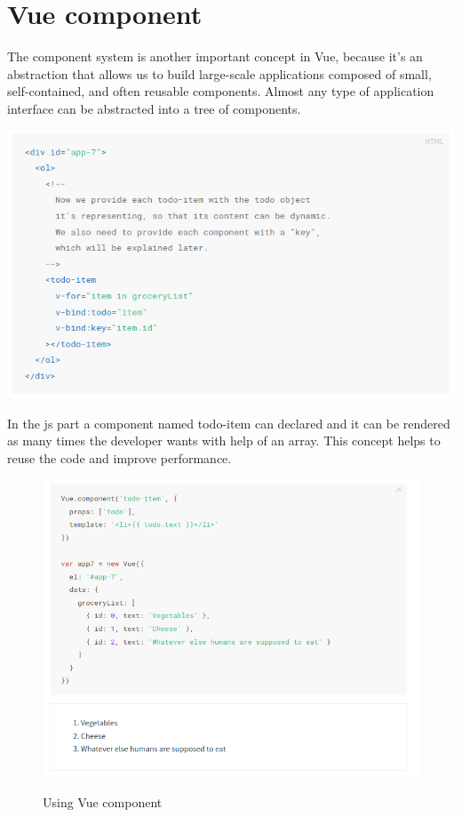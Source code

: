 \documentclass[12pt,a4paper,oneside]{report}
\begin{document}
\section{Vue component}
The component system is another important concept in Vue, because it’s an abstraction that allows us to build large-scale applications composed of small, self-contained, and often reusable components. Almost any type of application interface can be abstracted into a tree of components.
\begin{center}
    \includegraphics[scale=.6]{v-comp.png}
\end{center}
In the js part a component named todo-item can declared and it can be rendered as many times the developer wants with help of an array. This concept helps to reuse the code and improve performance. 
\begin{figure}[H]
    \begin{center}
        \label{abc}
            \includegraphics[scale=.6]{v-comp1.png}
            \caption{Using Vue component\cite{vue-code} }
    \end{center}
\end{figure}
\end{document}
